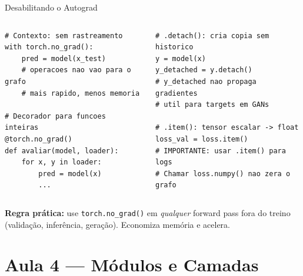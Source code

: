\documentclass[aspectratio=169, 10pt]{beamer}
\begin{document}

\begin{frame}[fragile]{Desabilitando o Autograd}
\begin{columns}
\begin{lstlisting}
# Contexto: sem rastreamento
with torch.no_grad():
    pred = model(x_test)
    # operacoes nao vao para o grafo
    # mais rapido, menos memoria

# Decorador para funcoes inteiras
@torch.no_grad()
def avaliar(model, loader):
    for x, y in loader:
        pred = model(x)
        ...
\end{lstlisting}

\begin{lstlisting}
# .detach(): cria copia sem historico
y = model(x)
y_detached = y.detach()
# y_detached nao propaga gradientes
# util para targets em GANs

# .item(): tensor escalar -> float
loss_val = loss.item()
# IMPORTANTE: usar .item() para logs
# Chamar loss.numpy() nao zera o grafo
\end{lstlisting}
\end{columns}

\begin{destaque}
  \textbf{Regra prática:} use \texttt{torch.no\_grad()} em \textit{qualquer} forward pass 
  fora do treino (validação, inferência, geração). Economiza memória e acelera.
\end{destaque}
\end{frame}

\section{Aula 4 — Módulos e Camadas}
\end{document}
